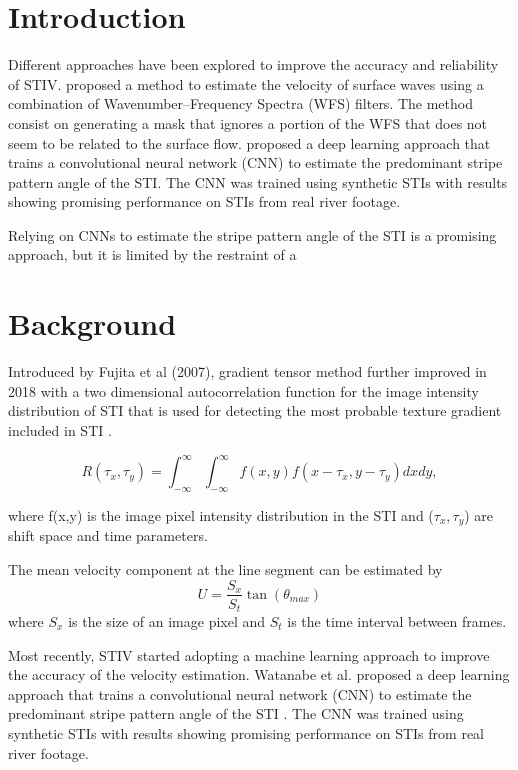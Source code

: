 \documentclass[12pt]{elsarticle}
\begin{document}
\section{Introduction}



Different approaches have been explored to improve the accuracy and reliability of STIV. \cite{fujita2020application} proposed a method to estimate the velocity of surface waves using a combination of Wavenumber–Frequency Spectra (WFS) filters. The method consist on generating a mask that ignores a portion of the WFS that does not seem to be related to the surface flow. \cite{watanabe2021improving} proposed a deep learning approach that trains a convolutional neural network (CNN) to estimate the predominant stripe pattern angle of the STI. The CNN was trained using synthetic STIs with results showing promising performance on STIs from real river footage.

Relying on CNNs to estimate the stripe pattern angle of the STI is a promising approach, but it is limited by the restraint of a 


\section{Background}
Introduced by Fujita et al (2007), gradient tensor method \cite{fujita2007development} further improved in 2018 with a two dimensional autocorrelation function for the image intensity distribution of STI that is used for detecting the most probable texture gradient included in STI \cite{fujita2019efficient}.

\begin{equation}
    R(\tau_x, \tau_y) = \int_{-\infty}^{\infty}\int_{-\infty}^{\infty} f(x, y) f(x - \tau_x, y - \tau_y) dx dy,
\end{equation}

where f(x,y) is the image pixel intensity distribution in the STI and (\(\tau_x, \tau_y\)) are shift space and time parameters.

The mean velocity component at the line segment can be  estimated by
\begin{equation}
    U=\frac{S_x}{S_t}\tan(\theta_{max})
\end{equation}
where $S_x$ is the size of an image pixel and $S_t$ is the time interval between frames. 

Most recently, STIV started adopting a machine learning approach to improve the accuracy of the velocity estimation. Watanabe et al. proposed a deep learning approach that trains a convolutional neural network (CNN) to estimate the predominant stripe pattern angle of the STI \cite{watanabe2021improving}. The CNN was trained using synthetic STIs with results showing promising performance on STIs from real river footage.
\end{document}
